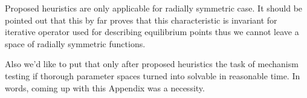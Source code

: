 \documentclass[%
 aip,
rsi,%
 amsmath,amssymb,
 reprint,%
]{revtex4-1}
\begin{document}
Proposed heuristics are only applicable for radially symmetric case. It should be pointed out that this by far proves that this characteristic is invariant for iterative operator used for describing equilibrium points thus we cannot leave a space of radially symmetric functions.

Also we'd like to put that only after proposed heuristics the task of mechanism testing if thorough parameter spaces turned into solvable in reasonable time. In words, coming up with this Appendix was a necessity.


%
%

%





%
\end{document}
